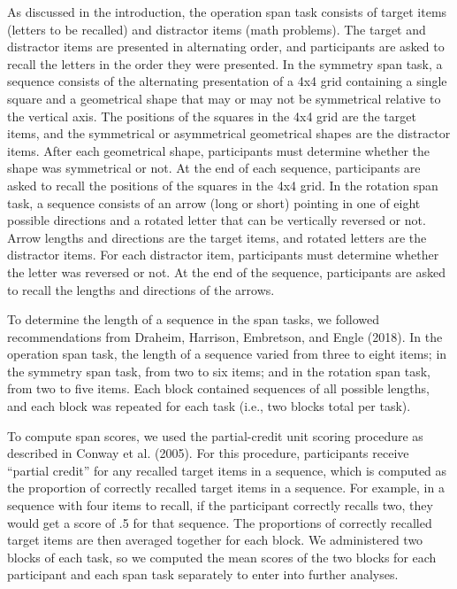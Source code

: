 \documentclass[
  man,floatsintext]{apa6}
\begin{document}
As discussed in the introduction, the operation span task consists of target items (letters to be recalled) and distractor items (math problems). The target and distractor items are presented in alternating order, and participants are asked to recall the letters in the order they were presented. In the symmetry span task, a sequence consists of the alternating presentation of a 4x4 grid containing a single square and a geometrical shape that may or may not be symmetrical relative to the vertical axis. The positions of the squares in the 4x4 grid are the target items, and the symmetrical or asymmetrical geometrical shapes are the distractor items. After each geometrical shape, participants must determine whether the shape was symmetrical or not. At the end of each sequence, participants are asked to recall the positions of the squares in the 4x4 grid. In the rotation span task, a sequence consists of an arrow (long or short) pointing in one of eight possible directions and a rotated letter that can be vertically reversed or not. Arrow lengths and directions are the target items, and rotated letters are the distractor items. For each distractor item, participants must determine whether the letter was reversed or not. At the end of the sequence, participants are asked to recall the lengths and directions of the arrows.

To determine the length of a sequence in the span tasks, we followed recommendations from Draheim, Harrison, Embretson, and Engle (2018). In the operation span task, the length of a sequence varied from three to eight items; in the symmetry span task, from two to six items; and in the rotation span task, from two to five items. Each block contained sequences of all possible lengths, and each block was repeated for each task (i.e., two blocks total per task).

To compute span scores, we used the partial-credit unit scoring procedure as described in Conway et al. (2005). For this procedure, participants receive ``partial credit'' for any recalled target items in a sequence, which is computed as the proportion of correctly recalled target items in a sequence. For example, in a sequence with four items to recall, if the participant correctly recalls two, they would get a score of .5 for that sequence. The proportions of correctly recalled target items are then averaged together for each block. We administered two blocks of each task, so we computed the mean scores of the two blocks for each participant and each span task separately to enter into further analyses.
\end{document}

